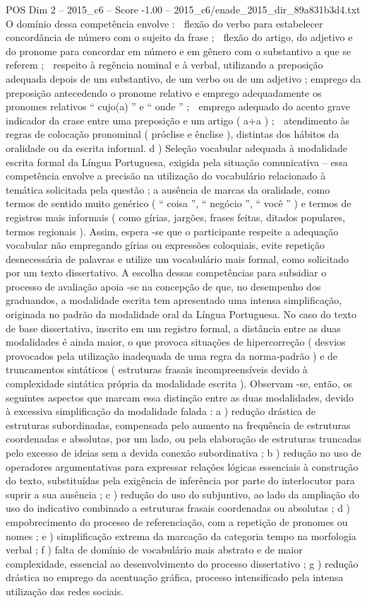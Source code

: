 \begin{textsample}{POS Dim 2 – 2015\_c6 – Score -1.00 – 2015\_c6/enade\_2015\_dir\_89a831b3d4.txt}
O domínio dessa competência envolve :  flexão do verbo para estabelecer concordância de número com o sujeito da frase ;  flexão do artigo, do adjetivo e do pronome para concordar em número e em gênero com o substantivo a que se referem ;  respeito à regência nominal e à verbal, utilizando a preposição adequada depois de um substantivo, de um verbo ou de um adjetivo ; emprego da preposição antecedendo o pronome relativo e emprego adequadamente os pronomes relativos “ cujo(a) ” e “ onde ” ;  emprego adequado do acento grave indicador da crase entre uma preposição e um artigo ( a+a ) ;  atendimento às regras de colocação pronominal ( próclise e ênclise ), distintas dos hábitos da oralidade ou da escrita informal. d ) Seleção vocabular adequada à modalidade escrita formal da Língua Portuguesa, exigida pela situação comunicativa – essa competência envolve a precisão na utilização do vocabulário relacionado à temática solicitada pela questão ; a ausência de marcas da oralidade, como termos de sentido muito genérico ( “ coisa ”, “ negócio ”, “ você ” ) e termos de registros mais informais ( como gírias, jargões, frases feitas, ditados populares, termos regionais ).
Assim, espera -se que o participante respeite a adequação vocabular não empregando gírias ou expressões coloquiais, evite repetição desnecessária de palavras e utilize um vocabulário mais formal, como solicitado por um texto dissertativo.
A escolha dessas competências para subsidiar o processo de avaliação apoia -se na concepção de que, no desempenho dos graduandos, a modalidade escrita tem apresentado uma intensa simplificação, originada no padrão da modalidade oral da Língua Portuguesa.
No caso do texto de base dissertativa, inscrito em um registro formal, a distância entre as duas modalidades é ainda maior, o que provoca situações de hipercorreção ( desvios provocados pela utilização inadequada de uma regra da norma-padrão ) e de truncamentos sintáticos ( estruturas frasais incompreensíveis devido à complexidade sintática própria da modalidade escrita ).
Observam -se, então, os seguintes aspectos que marcam essa distinção entre as duas modalidades, devido à excessiva simplificação da modalidade falada : a ) redução drástica de estruturas subordinadas, compensada pelo aumento na frequência de estruturas coordenadas e absolutas, por um lado, ou pela elaboração de estruturas truncadas pelo excesso de ideias sem a devida conexão subordinativa ; b ) redução no uso de operadores argumentativas para expressar relações lógicas essenciais à construção do texto, substituídas pela exigência de inferência por parte do interlocutor para suprir a sua ausência ; c ) redução do uso do subjuntivo, ao lado da ampliação do uso do indicativo combinado a estruturas frasais coordenadas ou absolutas ; d ) empobrecimento do processo de referenciação, com a repetição de pronomes ou nomes ; e ) simplificação extrema da marcação da categoria tempo na morfologia verbal ; f ) falta de domínio de vocabulário mais abstrato e de maior complexidade, essencial ao desenvolvimento do processo dissertativo ; g ) redução drástica no emprego da acentuação gráfica, processo intensificado pela intensa utilização das redes sociais.

\end{textsample}
